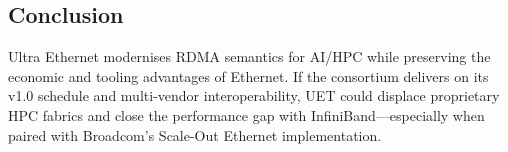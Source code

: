 \documentclass[../../../OAE-SPEC-MAIN.tex]{subfiles}
\begin{document}
\subsection{Conclusion}
Ultra Ethernet modernises RDMA semantics for AI/HPC while preserving
the economic and tooling advantages of Ethernet.  
If the consortium delivers on its v1.0 schedule and multi-vendor
interoperability, UET could displace proprietary HPC fabrics and close
the performance gap with InfiniBand—especially when paired with
Broadcom’s Scale-Out Ethernet implementation.

\end{document}
